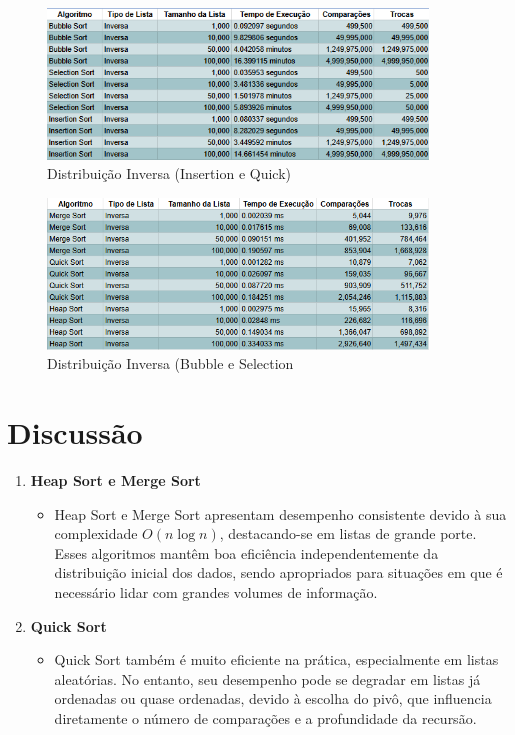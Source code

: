 \documentclass[12pt, a4paper]{report}
\begin{document}
\begin{figure}[H]
    \centering
    \includegraphics[width=0.9\textwidth]{listas/inversab.png}
    \caption{Distribuição Inversa (Insertion e Quick)}
    \label{fig:inversab}
\end{figure}
\begin{figure}[H]
    \centering
    \includegraphics[width=0.9\textwidth]{listas/inversam.png}
    \caption{Distribuição Inversa (Bubble e Selection}
    \label{fig:inversam}
\end{figure}



\chapter{Discussão}

\begin{enumerate}
    \item \textbf{Heap Sort e Merge Sort}
    \begin{itemize}
        \item Heap Sort e Merge Sort apresentam desempenho consistente devido à sua complexidade $O(n \log n)$, destacando-se em listas de grande porte. Esses algoritmos mantêm boa eficiência independentemente da distribuição inicial dos dados, sendo apropriados para situações em que é necessário lidar com grandes volumes de informação.
    \end{itemize}

    \item \textbf{Quick Sort}
    \begin{itemize}
        \item Quick Sort também é muito eficiente na prática, especialmente em listas aleatórias. No entanto, seu desempenho pode se degradar em listas já ordenadas ou quase ordenadas, devido à escolha do pivô, que influencia diretamente o número de comparações e a profundidade da recursão.
    \end{itemize}

   
\end{enumerate}
\end{document}
